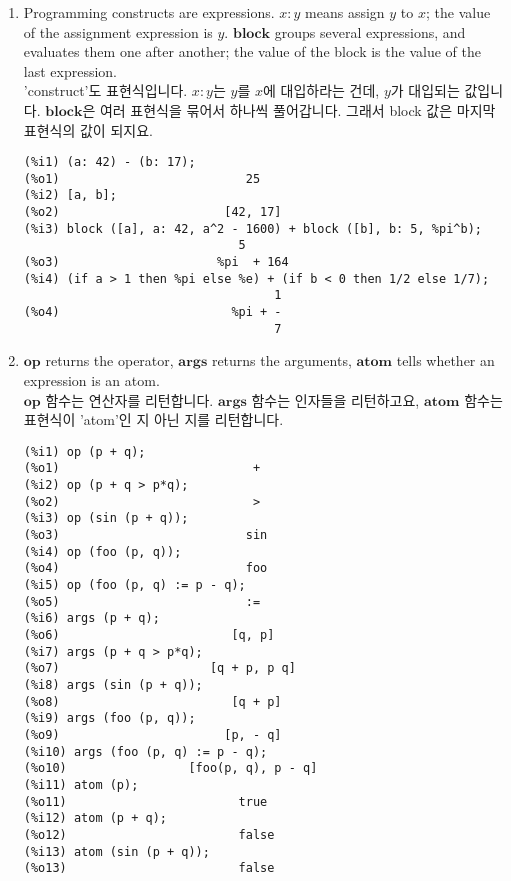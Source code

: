 \documentclass[12pt]{article}
\begin{document}
\begin{enumerate}
\item Programming constructs are expressions. 
$x : y$ means assign $y$ to $x$; the value of the assignment expression is $y$.
$\mathbf{block}$ groups several expressions, and evaluates them one after another;
the value of the block is the value of the last expression. \\

'construct'도 표현식입니다.
$x : y$는 $y$를 $x$에 대입하라는 건데, $y$가 대입되는 값입니다. $\mathbf{block}$은 
여러 표현식을 묶어서 하나씩 풀어갑니다. 그래서 block 값은 마지막 표현식의 값이 되지요.

\begin{verbatim}
(%i1) (a: 42) - (b: 17);
(%o1)                          25
(%i2) [a, b];
(%o2)                       [42, 17]
(%i3) block ([a], a: 42, a^2 - 1600) + block ([b], b: 5, %pi^b);
                              5
(%o3)                      %pi  + 164
(%i4) (if a > 1 then %pi else %e) + (if b < 0 then 1/2 else 1/7);
                                   1
(%o4)                        %pi + -
                                   7
\end{verbatim}

\item $\mathbf{op}$ returns the operator, $\mathbf{args}$ returns the arguments,
$\mathbf{atom}$ tells whether an expression is an atom. \\
$\mathbf{op}$ 함수는 연산자를 리턴합니다. $\mathbf{args}$ 함수는 인자들을 리턴하고요, $\mathbf{atom}$ 
함수는 표현식이 'atom'인 지 아닌 지를 리턴합니다.

\begin{verbatim}
(%i1) op (p + q);
(%o1)                           +
(%i2) op (p + q > p*q);
(%o2)                           >
(%i3) op (sin (p + q));
(%o3)                          sin
(%i4) op (foo (p, q));
(%o4)                          foo
(%i5) op (foo (p, q) := p - q);
(%o5)                          :=
(%i6) args (p + q);
(%o6)                        [q, p]
(%i7) args (p + q > p*q);
(%o7)                     [q + p, p q]
(%i8) args (sin (p + q));
(%o8)                        [q + p]
(%i9) args (foo (p, q));
(%o9)                       [p, - q]
(%i10) args (foo (p, q) := p - q);
(%o10)                 [foo(p, q), p - q]
(%i11) atom (p);
(%o11)                        true
(%i12) atom (p + q);
(%o12)                        false
(%i13) atom (sin (p + q));
(%o13)                        false
\end{verbatim}


\end{enumerate}
\end{document}
